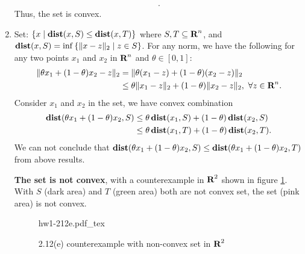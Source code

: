 \documentclass[12pt]{article}
\begin{document}
\begin{solution}[2.12(a)-(e)]
\begin{enumerate}[label=(\alph*)]
\begin{align*}
			.\end{align*}
			Thus, the set is convex.
		\item Set: $\left\{ x \mid \mathop{\bf dist{}}(x,S)\le \mathop{\bf dist{}}(x,T) \right\} $ where $S,T\subseteq {\mbox{\bf R}}^n$, and  $\mathop{\bf dist{}}(x,S)=\inf \left\{ \|x-z\|_2  \mid z\in S\right\} $. 
			For any norm, we have the following for any two points $x_1$ and $x_2$ in ${\mbox{\bf R}}^n$ and $\theta\in\left[ 0,1 \right] $:
			\begin{align*}
				\|\theta x_1+(1-\theta)x_2-z\|_2 &= \|\theta(x_1-z)+(1-\theta)(x_2-z)\|_2\\
																				 &\le \theta \|x_1-z\|_2 + (1-\theta) \|x_2-z\|_2,\ \forall z\in {\mbox{\bf R}}^n
			.\end{align*}
			Consider $x_1$ and $x_2$ in the set, we have convex combination
			\begin{align*}
				\mathop{\bf dist{}}(\theta x_1+(1-\theta)x_2, S) &\le \theta \mathop{\bf dist{}}(x_1, S) + (1-\theta)\mathop{\bf dist{}}(x_2, S) \\
																					 &\le \theta \mathop{\bf dist{}}(x_1, T) + (1-\theta)\mathop{\bf dist{}}(x_2, T)
			.\end{align*}
			We can not conclude that $\mathop{\bf dist{}}(\theta x_1+(1-\theta)x_2, S) \le \mathop{\bf dist{}}(\theta x_1+(1-\theta)x_2, T)$ from above results.

			\textbf{The set is not convex}, with a counterexample in ${\mbox{\bf R}}^2$ shown in figure \ref{fig:-figures-hw1-212e-pdf}. With $S$ (dark area) and $T$ (green area) both are not convex set, the set (pink area) is not convex.
			\begin{figure}[htpb]
				\centering
				\def\svgwidth{.6\columnwidth}
			{hw1-212e.pdf_tex}
				\caption{2.12(e) counterexample with non-convex set in ${\mbox{\bf R}}^2$}
				\label{fig:-figures-hw1-212e-pdf}
			\end{figure}

	\end{enumerate}
	
\end{solution}
\end{document}
